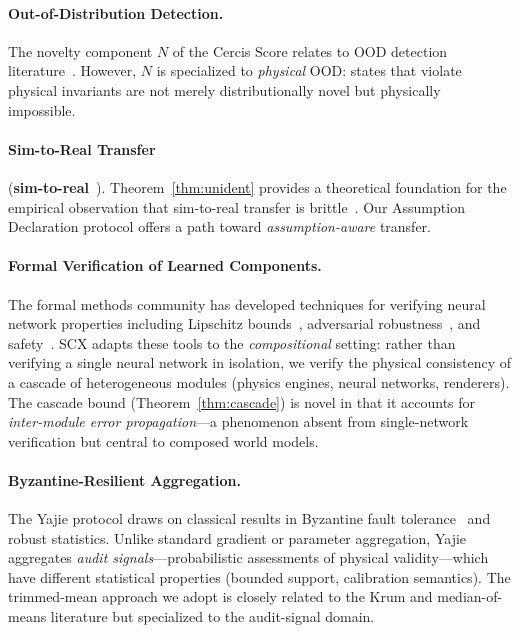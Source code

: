 \documentclass[11pt,twocolumn]{article}
\theoremstyle{definition}
\begin{document}
\paragraph{Out-of-Distribution Detection.}
The novelty component $N$ of the Cercis Score relates to OOD detection
literature~\cite{hendrycks2019baseline,yang2022ood}.  However, $N$ is
specialized to \emph{physical} OOD: states that violate physical invariants
are not merely distributionally novel but physically impossible.

\paragraph{Sim-to-Real Transfer} (\textbf{sim-to-real}~).
Theorem~\ref{thm:unident} provides a theoretical foundation for the empirical
observation that sim-to-real transfer is brittle~\cite{zhao2020sim}.
Our Assumption Declaration protocol offers a path toward
\emph{assumption-aware} transfer.

\paragraph{Formal Verification of Learned Components.}
The formal methods community has developed techniques for verifying neural
network properties including Lipschitz bounds~\cite{fazlyab2019efficient},
adversarial robustness~\cite{zhang2018crown,wang2021beta}, and
safety~\cite{katz2017reluplex}.  SCX adapts these tools to the
\emph{compositional} setting: rather than verifying a single neural network
in isolation, we verify the physical consistency of a cascade of
heterogeneous modules (physics engines, neural networks, renderers).  The
cascade bound (Theorem~\ref{thm:cascade}) is novel in that it accounts for
\emph{inter-module error propagation}---a phenomenon absent from
single-network verification but central to composed world models.

\paragraph{Byzantine-Resilient Aggregation.}
The Yajie protocol draws on classical results in Byzantine fault
tolerance~\cite{lamport1982byzantine,blanchard2017machine} and robust
statistics.  Unlike standard gradient or parameter aggregation, Yajie
aggregates \emph{audit signals}---probabilistic assessments of physical
validity---which have different statistical properties
(bounded support, calibration semantics).  The trimmed-mean approach we
adopt is closely related to the Krum and median-of-means literature but
specialized to the audit-signal domain.
\end{document}
